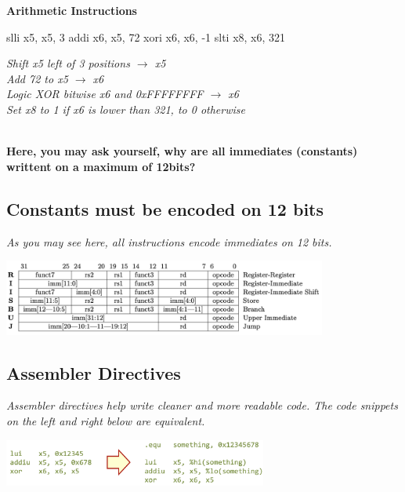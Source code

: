 \textbf{Arithmetic Instructions} \\
\vspace*{10px}
\begin{minipage}{0.4\textwidth}
\begin{assembly}
slli x5, x5, 3
addi x6, x5, 72
xori x6, x6, -1
slti x8, x6, 321
\end{assembly}
\end{minipage}%
\hfill
\vline
\hfill
\begin{minipage}{0.5\textwidth}
\small
\textit{Shift x5 left of 3 positions $\rightarrow$ x5} \\
\textit{Add 72 to x5 $\rightarrow$ x6} \\
\textit{Logic XOR bitwise x6 and 0xFFFFFFFF $\rightarrow$ x6} \\
\textit{Set x8 to 1 if x6 is lower than 321, to 0 otherwise} \\
\end{minipage} \\
\textbf{Here, you may ask yourself, why are all immediates (constants) writtent on a maximum of 12bits?} \\
\subsection{Constants must be encoded on 12 bits}
\textit{As you may see here, all instructions encode immediates on 12 bits.}
\begin{center}
    \includegraphics[width=0.8\textwidth]{chapters/chapter1b/images/riscv.png}
\end{center}

\subsection{Assembler Directives} \textit{Assembler directives help write cleaner and more readable code. The code snippets on the left and right below are equivalent.}

\begin{center} \includegraphics[width=0.65\textwidth]{chapters/chapter1b/images/directives.png} \end{center}

